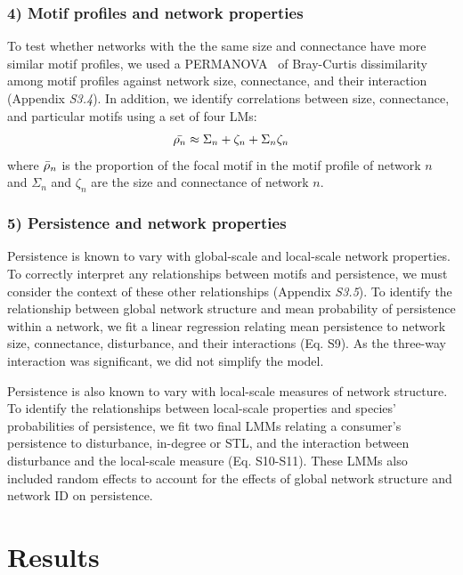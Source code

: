 \documentclass[12pt]{article}
\begin{document}
\begin{spacing}{2.0}
    \subsubsection*{4) Motif profiles and network properties}
    
        To test whether networks with the the same size and connectance have more similar motif profiles, we used a PERMANOVA~\citep{Anderson2001} of Bray-Curtis dissimilarity among motif profiles against network size, connectance, and their interaction (Appendix \emph{S3.4}). 
        In addition, we identify correlations between size, connectance, and particular motifs using a set of four LMs:
        \begin{equation}
            \Bar{\rho_{n}} \approx \Sigma_{n} + \zeta_{n} + \Sigma_{n}\zeta_{n}
        \label{profile_global}
        \end{equation}
        \noindent where $\Bar{\rho}_{n}$ is the proportion of the focal motif in the motif profile of network $n$ and $\Sigma_n$ and $\zeta_{n}$ are the size and connectance of network $n$.
        
    \subsubsection*{5) Persistence and network properties}
        
        Persistence is known to vary with global-scale and local-scale network properties.
        To correctly interpret any relationships between motifs and persistence, we must consider the context of these other relationships (Appendix \emph{S3.5}).
        To identify the relationship between global network structure and mean probability of persistence within a network, we fit a linear regression relating mean persistence to network size, connectance, disturbance, and their interactions (Eq. S9).
        As the three-way interaction was significant, we did not simplify the model. 


        Persistence is also known to vary with local-scale measures of network structure. 
        To identify the relationships between local-scale properties and species' probabilities of persistence, we fit two final LMMs relating a consumer's persistence to disturbance, in-degree or STL, and the interaction between disturbance and the local-scale measure (Eq. S10-S11).
        These LMMs also included random effects to account for the effects of global network structure and network ID on persistence.


\section*{Results}


\end{spacing}
\end{document}
